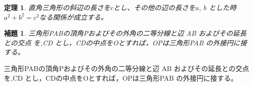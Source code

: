 \documentclass[a5paper]{jarticle}
\newtheorem{theo}{定理}[section]
\newtheorem{lemm}{補題}[section]
\newenvironment{lightgrayleftbar}{%
  \def\FrameCommand{\textcolor{lightgray}{\vrule width 1zw} \hspace{10pt}}%
  \MakeFramed {\advance\hsize-\width \FrameRestore}}%
{\endMakeFramed}
\begin{document}
\begin{lightgrayleftbar}
\begin{theo}
直角三角形の斜辺の長さを$c$とし、その他の辺の長さを$ a$, $b$ とした時$ a^2+ b^2= c^2$なる関係が成立する。
\end{theo}
\end{lightgrayleftbar}

\begin{lightgrayleftbar}
\begin{lemm}
三角形PABの頂角Pおよびその外角の二等分線と辺 AB およびその延長との交点
を,CD とし，CDの中点をOとすれば，OPは三角形PAB の外接円に接する。
\end{lemm}
\end{lightgrayleftbar}

三角形PABの頂角Pおよびその外角の二等分線と辺 AB およびその延長との交点
を,CD とし，CDの中点をOとすれば，OPは三角形PAB の外接円に接する。
\end{document}

